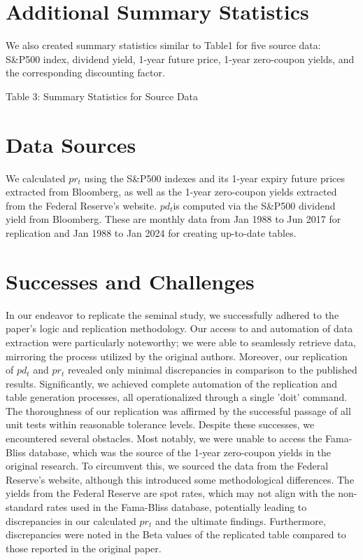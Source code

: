 \documentclass{article}
\begin{document}
\section{Additional Summary Statistics}
We also created summary statistics similar to Table1 for five source data: 
S\&P500 index, dividend yield, 1-year future price, 1-year 
zero-coupon yields, and the corresponding discounting factor.

\begin{table}[H]
\centering

\caption*{Table 3: Summary Statistics for Source Data}
\label{tab:your_label}
\end{table}    


\section{Data Sources}
We calculated \(pr_t\) using the S\&P500 indexes and its 1-year expiry 
future prices extracted from Bloomberg, as well as the 1-year zero-coupon 
yields extracted from the Federal Reserve’s website. \(pd_t \)is 
computed via the S\&P500 dividend yield from Bloomberg. These are 
monthly data from Jan 1988 to Jun 2017 for replication and Jan 1988 
to Jan 2024 for creating up-to-date tables.

\section{Successes and Challenges}
In our endeavor to replicate the seminal study, we successfully 
adhered to the paper's logic and replication methodology. Our access 
to and automation of data extraction were particularly noteworthy; 
we were able to seamlessly retrieve data, mirroring the process utilized 
by the original authors. Moreover, our replication of $pd_t$ and $pr_t$ 
revealed only minimal discrepancies in comparison to the published results. 
Significantly, we achieved complete automation of the replication and 
table generation processes, all operationalized through a single 'doit' 
command. The thoroughness of our replication was affirmed by the 
successful passage of all unit tests within reasonable tolerance levels.
\newline
\newline
Despite these successes, we encountered several obstacles. Most notably, 
we were unable to access the Fama-Bliss database, which was the 
source of the 1-year zero-coupon yields in the original research. To 
circumvent this, we sourced the data from the Federal Reserve's website, 
although this introduced some methodological differences. The yields 
from the Federal Reserve are spot rates, which may not align with the 
non-standard rates used in the Fama-Bliss database, potentially leading 
to discrepancies in our calculated $pr_t$ and the ultimate findings. 
Furthermore, discrepancies were noted in the Beta values of the 
replicated table compared to those reported in the original paper.
\end{document}
